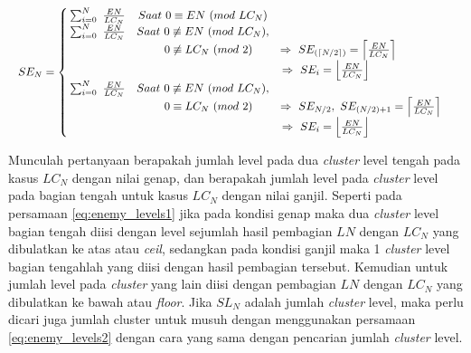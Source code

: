 \begin{equation}\label{eq:enemy_levels2}
\resizebox{\columnwidth}{!}{%
	$SE_{N} = \left\{\begin{matrix}
	\hspace{0.2em} \sum_{i = 0}^{N}\ \frac{EN}{LC_{N}} & Saat\ 0 \equiv EN\ (mod\ LC_{N}) & \\
	
	\hspace{0.2em} \sum_{i = 0}^{N}\ \frac{EN}{LC_{N}} & Saat\ 0 \not\equiv EN\ (mod\ LC_{N}), & \\
	&\hspace{1.0em}  0 \not\equiv LC_{N}\ (mod\ 2) & \hspace{-4.0em} \Rightarrow\ SE_{(\left \lceil N/2 \right \rceil)}  = \left \lceil \frac{EN}{LC_{N}} \right \rceil &\\
	
	& & \hspace{-6.2em} \Rightarrow\ SE_{i}  = \left \lfloor \frac{EN}{LC_{N}} \right \rfloor &\\
	
	\hspace{0.2em} \sum_{i = 0}^{N}\ \frac{EN}{LC_{N}} & Saat\ 0 \not\equiv EN\ (mod\ LC_{N}), & \\
	&\hspace{1.0em}  0 \equiv LC_{N}\ (mod\ 2) & \Rightarrow\ SE_{N/2},\ SE_{(N/2) + 1}  = \left \lceil \frac{EN}{LC_{N}} \right \rceil &\\
	
	& & \hspace{-6.2em} \Rightarrow\ SE_{i}  = \left \lfloor \frac{EN}{LC_{N}} \right \rfloor &\\
	\end{matrix}\right.$%
}
\end{equation}

Munculah pertanyaan berapakah jumlah level pada dua \textit{cluster} level tengah pada kasus $LC_{N}$ dengan nilai genap, dan berapakah jumlah level pada \textit{cluster} level pada bagian tengah untuk kasus $LC_{N}$ dengan nilai ganjil. Seperti pada persamaan \ref{eq:enemy_levels1} jika pada kondisi genap maka dua \textit{cluster} level bagian tengah diisi dengan level sejumlah hasil pembagian $LN$ dengan $LC_{N}$ yang dibulatkan ke atas atau \textit{ceil}, sedangkan pada kondisi ganjil maka 1 \textit{cluster} level bagian tengahlah yang diisi dengan hasil pembagian tersebut. Kemudian untuk jumlah level pada \textit{cluster} yang lain diisi dengan pembagian $LN$ dengan $LC_{N}$ yang dibulatkan ke bawah atau \textit{floor}. Jika $SL_{N}$ adalah jumlah \textit{cluster} level, maka perlu dicari juga jumlah cluster untuk musuh dengan menggunakan persamaan \ref{eq:enemy_levels2} dengan cara yang sama dengan pencarian jumlah \textit{cluster} level. 
\vspace{1ex}

